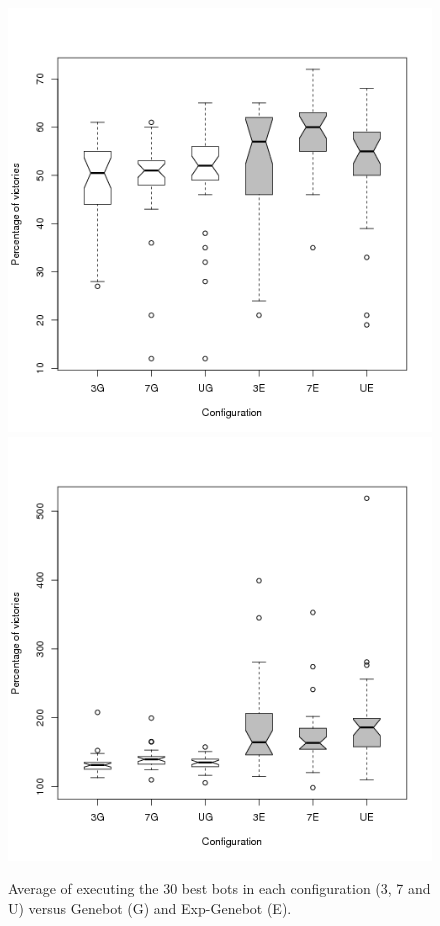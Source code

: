 \begin{figure}
\centering

   \includegraphics[scale =0.30] {gfx/rts/victories.png}
   \label{fig:subfig1}
   \includegraphics[scale =0.30] {gfx/rts/turns.png}
   \label{fig:subfig2}
\caption{Average of executing the 30 best bots in each configuration (3, 7 and U) versus Genebot (G) and Exp-Genebot (E).}

\label{fig:victories}
\end{figure}

